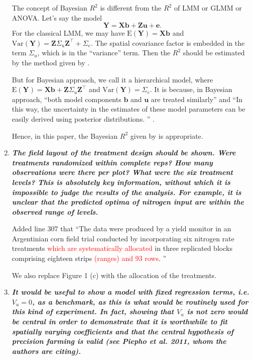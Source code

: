 \documentclass[a4paper]{article}   	%
\newcommand{\E}{\mathrm{E}}
\newcommand{\Var}{\mathrm{Var}}
\newcommand{\qtitle}[1]{\textit{\textbf{#1}}}
\begin{document}
\begin{enumerate}
    
    The concept of Bayesian $R^2$ is different from the $R^2$ of LMM or GLMM or ANOVA. Let's say the model
   	\begin{equation}\label{eq:modelmatrix}
    	\bm{Y} = \bm{X}\bm{b}+\bm{Z}\bm{u}+\bm{e}.
    \end{equation}
	For the classical LMM, we may have 
	$\E(\bm{Y}) = \bm{X}\bm{b}$ and $\Var(\bm{Y}) = \bm{Z}\Sigma_u\bm{Z}^\top+\Sigma_e$. The spatial covariance factor is embedded in the term $\Sigma_u$, which is in the ``variance'' term. Then the $R^2$ should be estimated by the method given by \textcite{Piepho2019Coefficient}. 
	
	But for Bayesian approach, we call it a hierarchical model, where $\E(\bm{Y}) = \bm{X}\bm{b} + \bm{Z}\Sigma_u\bm{Z}^\top$ and $\Var(\bm{Y}) = \Sigma_e$. It is because, in Bayesian approach, ``both model components $\bm{b}$ and $\bm{u}$ are treated similarly'' and ``In this way, the uncertainty in the estimates of these model parameters can be easily derived using posterior distributions. '' \parencite{Burkner2017Brms}. 

    Hence, in this paper, the Bayesian $R^2$ given by \textcite{Gelman2019Rsquared} is appropriate. 
    
    \item \qtitle{The field layout of the treatment design should be shown. Were treatments randomized within complete reps? How many observations were there per plot? What were the six treatment levels? This is absolutely key information, without which it is impossible to judge the results of the analysis. For example, it is unclear that the predicted optima of nitrogen input are within the observed range of levels.}

    Added line 307 that ``The data were produced by a yield monitor in an Argentinian corn field trial conducted by incorporating six nitrogen rate treatments \textcolor{red}{which are systematically allocated} in three replicated blocks comprising eighteen strips \textcolor{red}{(ranges) and 93 rows}. ''
    
    We also replace Figure 1 (c) with the allocation of the treatments. 
    
    \item \qtitle{It would be useful to show a model with fixed regression terms, i.e. $V_u = 0$, as a benchmark, as this is what would be routinely used for this kind of experiment. In fact, showing that $V_u$ is not zero would be central in order to demonstrate that it is worthwhile to fit spatially varying coefficients and that the central hypothesis of precision farming is valid (see Piepho et al. 2011, whom the authors are citing).}


\end{enumerate}
\end{document}
